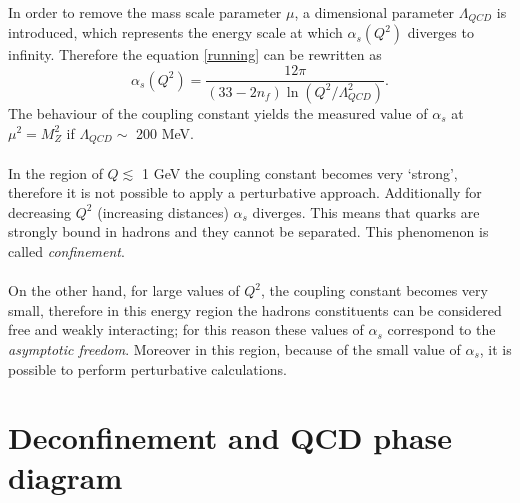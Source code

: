 \documentclass[b5paper,10pt,twoside,oldstyle,classica]{toptesi}
\begin{document}
In order to remove the mass scale parameter $\mu$, a dimensional parameter $\Lambda_{QCD}$ is introduced, which represents the energy scale at which $\alpha_s(Q^2)$ diverges to infinity. Therefore the equation \ref{running} can be rewritten as
\begin{equation}
 \alpha_s(Q^2) = \frac{12\pi}{(33-2n_f)\ln{(Q^2/\Lambda_{QCD}^2)}}.
\label{running2}
 \end{equation}
The behaviour of the coupling constant yields the measured value of $\alpha_s$ at $\mu^2 = M_Z^2$ if $\Lambda_{QCD} \sim$ 200 MeV.\\\\
In the region of $Q \lesssim $ 1 GeV  the coupling constant becomes very `strong', therefore it is not possible to apply a perturbative approach. Additionally for decreasing $Q^2$ (increasing distances) $\alpha_s$ diverges. This means that quarks are strongly bound in hadrons and they cannot be separated. This phenomenon is called \textit{confinement}. \\\\
On the other hand, for large values of $Q^2$, the coupling constant becomes very small, therefore in this energy region the hadrons constituents can be considered free and weakly interacting; for this reason these values of $\alpha_s$ correspond to the \textit{asymptotic freedom}.
Moreover in this region, because of the small value of $\alpha_s$, it is possible to perform perturbative calculations.
\section{Deconfinement and QCD phase diagram}
\end{document}
